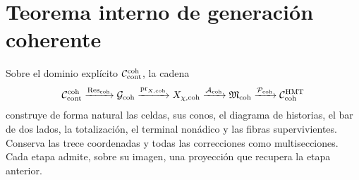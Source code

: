 \section{Teorema interno de generación coherente}
\label{sec:pdfv2-coh-theorem}

\begin{theorem}
\label{thm:pdfv2-coh-internal-generation}
Sobre el dominio explícito \(\mathcal C_{\rm cont}^{\rm coh}\), la cadena
\[
 \mathcal C_{\rm cont}^{\rm coh}
 \xrightarrow{\operatorname{Res}_{\rm coh}}
 \mathcal G_{\rm coh}
 \xrightarrow{\operatorname{pr}_{X,{\rm coh}}}
 X_{\chi,{\rm coh}}
 \xrightarrow{\mathcal A_{\rm coh}}
 \mathfrak M_{\rm coh}
 \xrightarrow{\mathcal P_{\rm coh}}
 \mathcal C_{\rm coh}^{\rm HMT}
\]
construye de forma natural las celdas, sus conos, el diagrama de historias, el
bar de dos lados, la totalización, el terminal nonádico y las fibras
supervivientes. Conserva las trece coordenadas y todas las correcciones como
multisecciones. Cada etapa admite, sobre su imagen, una proyección que recupera
la etapa anterior.
\end{theorem}


